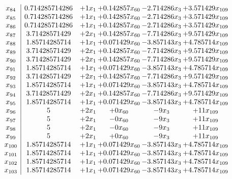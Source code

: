 \documentclass[11pt]{article}
\begin{document}
\[\begin{array}{c| c c@{\hskip 2pt} c@{\hskip 2pt} c@{\hskip 2pt} c@{\hskip 2pt} }
 x_{84}   &  0.714285714286 & + 1 x_{1} & + 0.142857 x_{60} & -2.714286 x_{3} & + 3.571429 x_{109}\\
 x_{85}   &  0.714285714286 & + 1 x_{1} & + 0.142857 x_{60} & -2.714286 x_{3} & + 3.571429 x_{109}\\
 x_{86}   &  0.714285714286 & + 1 x_{1} & + 0.142857 x_{60} & -2.714286 x_{3} & + 3.571429 x_{109}\\
 x_{87}   &  3.71428571429 & + 2 x_{1} & + 0.142857 x_{60} & -7.714286 x_{3} & + 9.571429 x_{109}\\
 x_{88}   &  1.85714285714 & + 1 x_{1} & + 0.071429 x_{60} & -3.857143 x_{3} & + 4.785714 x_{109}\\
 x_{89}   &  3.71428571429 & + 2 x_{1} & + 0.142857 x_{60} & -7.714286 x_{3} & + 9.571429 x_{109}\\
 x_{90}   &  3.71428571429 & + 2 x_{1} & + 0.142857 x_{60} & -7.714286 x_{3} & + 9.571429 x_{109}\\
 x_{91}   &  1.85714285714 & + 1 x_{1} & + 0.071429 x_{60} & -3.857143 x_{3} & + 4.785714 x_{109}\\
 x_{92}   &  3.71428571429 & + 2 x_{1} & + 0.142857 x_{60} & -7.714286 x_{3} & + 9.571429 x_{109}\\
 x_{93}   &  1.85714285714 & + 1 x_{1} & + 0.071429 x_{60} & -3.857143 x_{3} & + 4.785714 x_{109}\\
 x_{94}   &  3.71428571429 & + 2 x_{1} & + 0.142857 x_{60} & -7.714286 x_{3} & + 9.571429 x_{109}\\
 x_{95}   &  1.85714285714 & + 1 x_{1} & + 0.071429 x_{60} & -3.857143 x_{3} & + 4.785714 x_{109}\\
 x_{96}   &  5 & + 2 x_{1} & + 0 x_{60} & -9 x_{3} & + 11 x_{109}\\
 x_{97}   &  5 & + 2 x_{1} & -0 x_{60} & -9 x_{3} & + 11 x_{109}\\
 x_{98}   &  5 & + 2 x_{1} & -0 x_{60} & -9 x_{3} & + 11 x_{109}\\
 x_{99}   &  5 & + 2 x_{1} & + 0 x_{60} & -9 x_{3} & + 11 x_{109}\\
 x_{100}   &  1.85714285714 & + 1 x_{1} & + 0.071429 x_{60} & -3.857143 x_{3} & + 4.785714 x_{109}\\
 x_{101}   &  1.85714285714 & + 1 x_{1} & + 0.071429 x_{60} & -3.857143 x_{3} & + 4.785714 x_{109}\\
 x_{102}   &  1.85714285714 & + 1 x_{1} & + 0.071429 x_{60} & -3.857143 x_{3} & + 4.785714 x_{109}\\
 x_{103}   &  1.85714285714 & + 1 x_{1} & + 0.071429 x_{60} & -3.857143 x_{3} & + 4.785714 x_{109}\\

\end{array}\]
\end{document}
